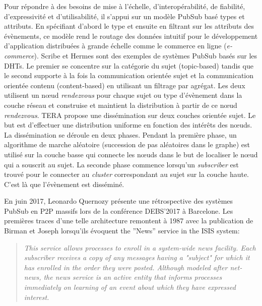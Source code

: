 Pour répondre à des besoins de mise à l'échelle, d'interopérabilité, de fiabilité, 
d'expressivité et d'utilisabilité, il s'appui sur un modèle \gls{PubSub} basé types et 
attributs. 
En spécifiant d'abord le type et ensuite en filtrant sur les attributs des 
évènements, ce modèle rend le routage des données intuitif pour le 
développement d'application distribuées à grande échelle comme le commerce en 
ligne (\textit{e-commerce}). 
Scribe \cite{Castro2002} et Hermes \cite{Pietzuch2002} sont des exemples de 
systèmes \gls{PubSub} basés sur les \glspl{DHT}. 
Le premier se concentre sur la catégorie du sujet (topic-based) tandis que le second 
supporte à la fois la communication orientée sujet et la communication orientée contenu (content-based) en utilisant un 
filtrage par agrégat. Les deux utilisent un n\oe ud \textit{rendezvous} pour chaque 
sujet ou type d'évènement dans la couche réseau et construise et maintient la 
distribution à partir de ce n\oe ud \textit{rendezvous}. TERA \cite{Baldoni2007} 
propose une dissémination sur deux couches orientée sujet. Le but est d'effectuer 
une distribution uniforme en fonction des intérêts des n\oe uds. La dissémination 
se déroule en deux phases. Pendant la première phase, un algorithme de marche aléatoire (succession de pas aléatoires dans le graphe)
est utilisé sur la couche basse qui connecte les n\oe uds dans le but de localiser 
le n\oe ud qui a souscrit au sujet. La seconde phase commence lorsqu'un 
\textit{subscriber} est trouvé pour le connecter au \textit{cluster} correspondant au 
sujet sur la couche haute. C'est là que l'évènement est disséminé.

En juin 2017, Leonardo Quernozy présente une rétrospective des systèmes 
\gls{PubSub} en \gls{P2P} massifs lors de la conférence DEBS'2017 à 
Barcelone. 
Les premières traces d'une telle architecture remontent à 1987 avec 
la publication de Birman et Joseph \cite{Birman1987} lorsqu'ils évoquent \og 
the ''News'' service in the ISIS system\fg{}:

\blockcquote{Birman1987}{
	\og\textit{ This service allows processes to enroll in a 
		system-wide news facility. Each subscriber receives a
		copy of any messages having a "subject" for which it 
		has enrolled in the order they were posted. Although 
		modeled after net-news, the news service is an active 
		entity that informs processes immediately on learning 
		of an event about which they have expressed interest.}\fg{}
}


